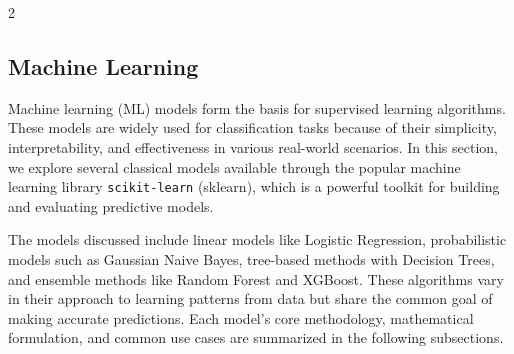 \documentclass[bst/sn-nature]{sn-jnl}
\begin{document}
\begin{multicols}{2}
\subsection{Machine Learning}

\quad Machine learning (ML) models form the basis for supervised learning algorithms. These models are widely used for classification tasks because of their simplicity, interpretability, and effectiveness in various real-world scenarios. In this section, we explore several classical models available through the popular machine learning library \texttt{scikit-learn\cite{sklearn_api}} (sklearn), which is a powerful toolkit for building and evaluating predictive models.

The models discussed include linear models like Logistic Regression, probabilistic models such as Gaussian Naive Bayes, tree-based methods with Decision Trees, and ensemble methods like Random Forest and XGBoost. These algorithms vary in their approach to learning patterns from data but share the common goal of making accurate predictions. Each model's core methodology, mathematical formulation, and common use cases are summarized in the following subsections.


\end{multicols}
\end{document}

